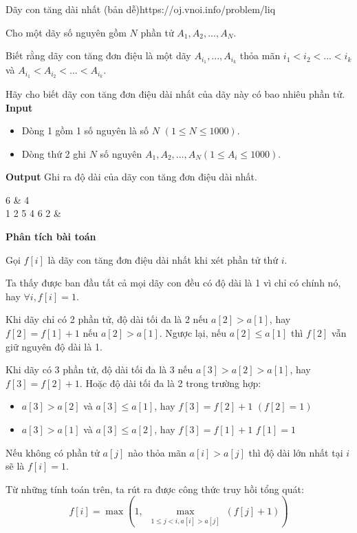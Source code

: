 \begin{baitap}{Dãy con tăng dài nhất (bản dễ)}{https://oj.vnoi.info/problem/liq}

Cho một dãy số nguyên gồm $N$ phần tử $A_1, A_2,...,A_N$.

Biết rằng dãy con tăng đơn điệu là một dãy $A_{i_1},...,A_{i_k}$ thỏa mãn $i_1 < i_2 <...<i_k$ và $A_{i_1} < A_{i_2} <...<A_{i_k}$. 

Hãy cho biết dãy con tăng đơn điệu dài nhất của dãy này có bao nhiêu phần tử.
\textbf{Input}
\begin{itemize}[noitemsep]
  \item Dòng 1 gồm 1 số nguyên là số $N$ $(1 \leq N \leq 1000)$.
  \item Dòng thứ 2 ghi $N$ số nguyên $A_1, A_2, \dots, A_N (1 \leq A_i \leq 1000)$.
\end{itemize}

\textbf{Output}
Ghi ra độ dài của dãy con tăng đơn điệu dài nhất.

\end{baitap}

\begin{sampleio}
6 & 4 \\
1 2 5 4 6 2 & \\
\end{sampleio}

\textbf{Phân tích bài toán}

Gọi \( f[i] \) là dãy con tăng đơn điệu dài nhất khi xét phần tử thứ $i$.

Ta thấy được ban đầu tất cả mọi dãy con đều có độ dài là 1 vì chỉ có chính nó, hay $\forall i, f[i] = 1$.

Khi dãy chỉ có 2 phần tử, độ dài tối đa là 2 nếu $a[2] > a[1]$, hay $f[2] = f[1] + 1$ nếu $a[2] > a[1]$. Ngược lại, nếu $a[2] \leq a[1]$ thì $f[2]$ vẫn giữ nguyên độ dài là 1.

Khi dãy có 3 phần tử, độ dài tối đa là 3 nếu $a[3] > a[2] > a[1]$, hay $f[3] = f[2] + 1$. Hoặc độ dài tối đa là 2 trong trường hợp:
\begin{itemize}
    \item $a[3] > a[2]$ và $a[3] \leq a[1]$, hay $f[3] = f[2] + 1$ $(f[2] = 1)$
    \item $a[3] > a[1]$ và $a[3] \leq a[2]$, hay $f[3] = f[1] + 1$ $f[1] = 1$
\end{itemize}
Nếu không có phần tử $a[j]$ nào thỏa mãn $a[i] > a[j]$ thì độ dài lớn nhất tại $i$ sẽ là $f[i] =  1$.


Từ những tính toán trên, ta rút ra được công thức truy hồi tổng quát:
\[
    f[i] = \max \left( 1,\ \max_{\substack{1 \leq j < i, a[i] > a[j]}} \left( f[j] + 1 \right) \right)
\]

